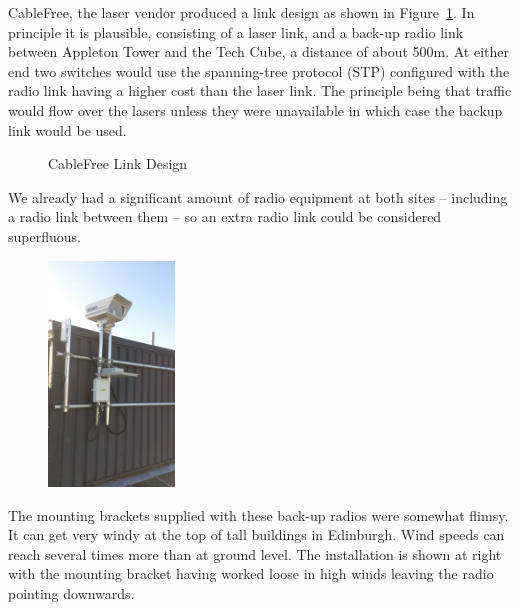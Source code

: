 \documentclass{amsart}
\begin{document}
CableFree, the laser vendor produced a link design as shown in
Figure~\ref{fig:cablefree-link}. In principle it is plausible,
consisting of a laser link, and a back-up radio link between Appleton
Tower and the Tech Cube, a distance of about 500m. At either end two
switches would use the spanning-tree protocol (STP) configured with the
radio link having a higher cost than the laser link. The principle
being that traffic would flow over the lasers unless they were
unavailable in which case the backup link would be used.
\def\cfdesign{%
    \node[draw,rotate=90] (atnetgear) at (0,0) {Netgear Switch};
    \node[draw] (atlaser) at (2,1) {Laser};
    \node[draw] (atradio) at (2,-1) {Radio};
    \node[draw] (tclaser) at (6,1) {Laser};
    \node[draw] (tcradio) at (6,-1) {Radio};
    \node[draw,rotate=-90] (tcnetgear) at (8,0) {Netgear Switch};
    \draw[thick,blue] (-1,0) edge (atnetgear.north);
    \draw[thick,blue] (9,0) edge (tcnetgear.north);
    \draw[thick,orange] (atnetgear.south) edge (atlaser.west);
    \draw[thick,orange] (tcnetgear.south) edge (tclaser.east);
    \draw[thick,blue] (atnetgear.south) edge (atradio.west);
    \draw[thick,blue] (tcnetgear.south) edge (tcradio.east);
    \draw[thick,red,dotted] (atlaser.east) edge (tclaser.west);
    \draw[thick,black,dotted] (atradio.east) edge (tcradio.west);
    \node at(4,0) {$\approx 500\text{m}$};
    \node at(4,1.5) {$\text{cost} = 1000$};
    \node at(4,-1.5) {$\text{cost} = 100000$};
}
\begin{figure}[h]
  \centering
  \caption{CableFree Link Design}
  \label{fig:cablefree-link}
\end{figure}

We already had a significant amount of radio equipment at
both sites -- including a radio link between them -- so an extra radio
link could be considered superfluous. 
\begin{figure}
  \includegraphics[angle=-90,width=0.3\textwidth]{also-faulty}
\end{figure}
The mounting brackets supplied with these back-up radios were somewhat flimsy. It can get very windy at the top
of tall buildings in Edinburgh. Wind speeds can reach several times
more than at ground level. The installation is shown at right with the
mounting bracket having worked loose in high winds leaving the radio
pointing downwards. 
\end{document}
